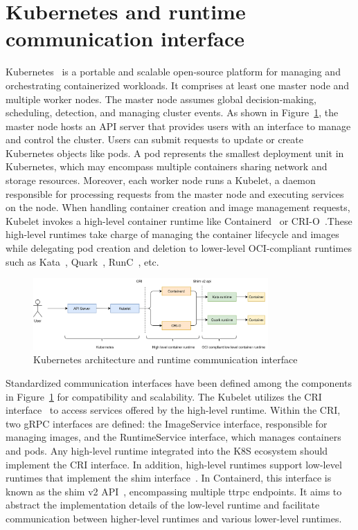 \section{Kubernetes and runtime communication interface}
\label{sec:k8s}
Kubernetes~\cite*{k8s} is a portable and scalable open-source platform for managing and orchestrating containerized workloads. It comprises at least one master node and multiple worker nodes. The master node assumes global decision-making, scheduling, detection, and managing cluster events. As shown in Figure~\ref{fig:k8s}, 
the master node hosts an API server that provides users with an interface to manage and control the cluster. Users can submit requests to update or create Kubernetes objects like pods. A pod represents the smallest deployment unit in Kubernetes, which may encompass multiple containers sharing network 
and storage resources. Moreover, each worker node runs a Kubelet, a daemon responsible for processing requests from the master node and executing services on the node. When handling container creation and image management requests, Kubelet invokes a high-level container runtime like 
Containerd~\cite*{containerd} or CRI-O~\cite*{cri-o}.These high-level runtimes take charge of managing the container lifecycle and images while delegating pod creation and 
deletion to lower-level OCI-compliant runtimes such as Kata~\cite*{Kata-Containers}, Quark~\cite*{quark}, RunC~\cite*{runc}, etc.
\begin{figure}[htp]
  \centering
  \includegraphics[width=0.8\textwidth]{images/k8s.PNG}
  \caption[Kubernetes architecture and runtime communication interface]{Kubernetes architecture and runtime communication interface}
  \label{fig:k8s}
\end{figure}

Standardized communication interfaces have been defined among the components in Figure~\ref{fig:k8s} for compatibility and scalability. The Kubelet utilizes the CRI interface~\cite*{cri-interface} to access services offered by the high-level runtime. Within the CRI, two gRPC interfaces are defined: the ImageService 
interface, responsible for managing images, and the RuntimeService interface, which manages containers and pods. Any high-level runtime integrated into the K8S ecosystem should implement the CRI interface. In addition, high-level runtimes support low-level runtimes that implement the shim interface~\cite*{shim_v2, cri0_shim_v2}. 
In Containerd, this interface is known as the shim v2 API~\cite*{shim_v2}, encompassing multiple ttrpc endpoints. It aims to abstract the implementation details of the low-level runtime and facilitate communication between higher-level runtimes and various lower-level runtimes.


